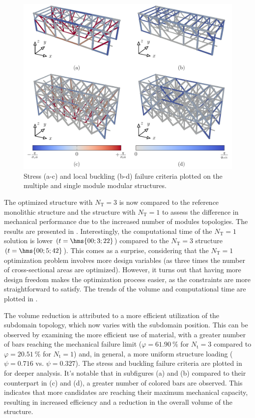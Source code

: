 \begin{figure}
    \centering
    \includegraphics[width=\linewidth]{figures/05_cellular_opt/00_multiple_failure/mul_mech.pdf}
    \caption{Stress (a-c) and local buckling (b-d) failure criteria plotted on the multiple and single module modular structures.}
    \label{fig:05_multiple_topology_sol_mech}
\end{figure}

The optimized structure with $N_\text{T}=3$ is now compared to the reference monolithic structure and the structure with $N_\text{T}=1$ to assess the difference in mechanical performance due to the increased number of modules topologies. The results are presented in . Interestingly, the computational time of the $N_\text{T}=1$ solution is lower $(t = \hms{00;3;22}$) compared to the $N_\text{T}=3$ structure $(t = \hms{00;5;42}$). This comes as a surprise, considering that the $N_\text{T}=1$ optimization problem involves more design variables (as three times the number of cross-sectional areas are optimized). However, it turns out that having more design freedom makes the optimization process easier, as the constraints are more straightforward to satisfy. The trends of the volume and computational time are plotted in .

The volume reduction is attributed to a more efficient utilization of the subdomain topology, which now varies with the subdomain position. This can be observed by examining the more efficient use of material, with a greater number of bars reaching the mechanical failure limit ($\varphi = \qty{61.90}{\%}$ for $N_\text{t} = 3$ compared to $\varphi = \qty{20.51}{\%}$ for $N_\text{t} = 1$) and, in general, a more uniform structure loading ($\psi = 0.716$ vs. $\psi = 0.327$). The stress and buckling failure criteria are plotted in  for deeper analysis. It's notable that in subfigures (a) and (b) compared to their counterpart in (c) and (d), a greater number of colored bars are observed. This indicates that more candidates are reaching their maximum mechanical capacity, resulting in increased efficiency and a reduction in the overall volume of the structure.

